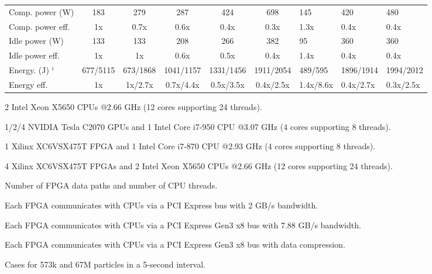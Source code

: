 \begin{table}[h]
\begin{spacing}{1.0}
\begin{threeparttable}
\begin{tabular}{| l || c c c c c g g g |}
		\hline
		Comp. power (W) 	   					& 183							& 279 						& 287  						& 424						& 698						& 145 		& 420		& 480		\\
		Comp. power eff.						& 1x							& 0.7x						& 0.6x 						& 0.4x						& 0.3x						& 1.3x 		& 0.4x 		& 0.4x		\\
		Idle power (W)    						& 133							& 133						& 208   					& 266 						& 382						& 95		& 360		& 360		\\
		Idle power eff.					    	& 1x							& 1x						& 0.6x	 					& 0.5x						& 0.4x						& 1.4x 	& 0.4x		& 0.4x		\\
		\hline
		Energy. (J) $^i$						& 677/5115						& 673/1868 					& 1041/1157 				& 1331/1456					& 1911/2054					& 489/595 	& 1896/1914	& 1994/2012	\\
		Energy eff.								& 1x							& 1x/2.7x 					& 0.7x/4.4x 				& 0.5x/3.5x 				& 0.4x/2.5x					& 1.4x/8.6x	& 0.4x/2.7x	& 0.3x/2.5x\\
		\hline
		\end{tabular}
			\begin{tablenotes}
			\item[a] 2 Intel Xeon X5650 CPUs @2.66 GHz (12 cores supporting 24 threads).
			\item[b] 1/2/4 NVIDIA Tesla C2070 GPUs and 1 Intel Core i7-950 CPU @3.07 GHz (4 cores supporting 8 threads).
			\item[c] 1 Xilinx XC6VSX475T FPGA and 1 Intel Core i7-870 CPU @2.93 GHz (4 cores supporting 8 threads).
			\item[d] 4 Xilinx XC6VSX475T FPGAs and 2 Intel Xeon X5650 CPUs @2.66 GHz (12 cores supporting 24 threads).
			\item[e] Number of FPGA data paths and number of CPU threads.
			\item[f] Each FPGA communicates with CPUs via a PCI Express bus with 2 GB/s bandwidth.
			\item[g] Each FPGA communicates with CPUs via a PCI Express Gen3 x8 bus with 7.88 GB/s bandwidth.
			\item[h] Each FPGA communicates with CPUs via a PCI Express Gen3 x8 bus with data compression.
			\item[i] Cases for 573k and 67M particles in a 5-second interval.
			\end{tablenotes}
		\end{threeparttable}
\end{spacing}
\end{table}

